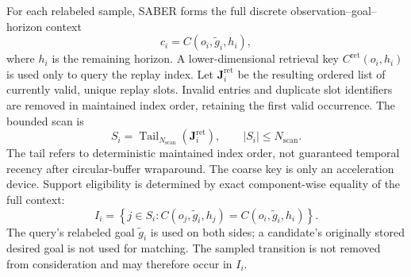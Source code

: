 For each relabeled sample, SABER forms the full discrete
observation--goal--horizon context
\begin{equation}
c_i=C(o_i,\widetilde g_i,h_i),
\label{eq:supp-full-context}
\end{equation}
where \(h_i\) is the remaining horizon. A lower-dimensional retrieval key
\(C^{\mathrm{ret}}(o_i,h_i)\) is used only to query the replay index. Let
\(\mathbf J_i^{\mathrm{ret}}\) be the resulting ordered list of currently
valid, unique replay slots. Invalid entries and duplicate slot identifiers
are removed in maintained index order, retaining the first valid occurrence.
The bounded scan is
\begin{equation}
S_i=
\operatorname{Tail}_{N_{\mathrm{scan}}}
\!\left(\mathbf J_i^{\mathrm{ret}}\right),
\qquad |S_i|\leq N_{\mathrm{scan}}.
\label{eq:supp-bounded-scan}
\end{equation}
The tail refers to deterministic maintained index order, not guaranteed
temporal recency after circular-buffer wraparound. The coarse key is only an
acceleration device. Support eligibility is determined by exact
component-wise equality of the full context:
\begin{equation}
I_i=
\left\{
j\in S_i:
C(o_j,\widetilde g_i,h_j)
=C(o_i,\widetilde g_i,h_i)
\right\}.
\label{eq:supp-local-set}
\end{equation}
The query's relabeled goal \(\widetilde g_i\) is used on both sides; a
candidate's originally stored desired goal is not used for matching. The
sampled transition is not removed from consideration and may therefore occur
in \(I_i\).

